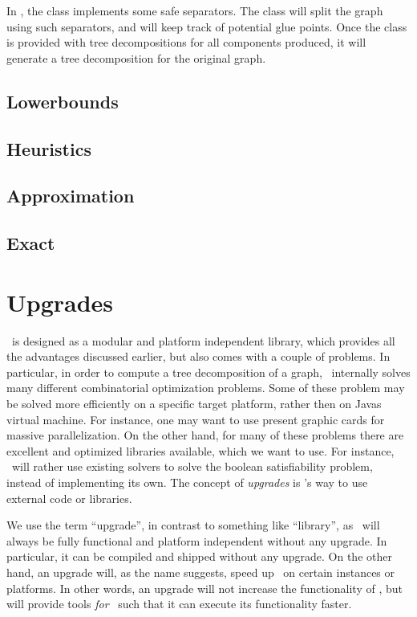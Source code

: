 \documentclass[a4paper, ukenglish, twoside, openright]{jdrasilmanual}
\begin{document}
In \Jdrasil, the class  implements some safe
separators. The class will split the graph using such separators, and
will keep track of potential glue points. Once the class is provided
with tree decompositions for all components produced, it will generate
a tree decomposition for the original graph.

\chapter{Lowerbounds}

\chapter{Heuristics}

\chapter{Approximation}

\chapter{Exact}

\part{Upgrades}

\Jdrasil\ is designed as a modular and platform independent library,
which provides all the advantages discussed earlier, but also comes
with a couple of problems. In particular, in order to compute a tree
decomposition of a graph, \Jdrasil\ internally solves many different
combinatorial optimization problems. Some of these problem may be
solved more efficiently on a specific target platform, rather then on
Javas virtual machine. For instance, one may want to use present
graphic cards for massive parallelization. On the other hand, for many
of these problems there are excellent and optimized libraries
available, which we want to use. For instance, \Jdrasil\ will rather
use existing  solvers to solve the boolean satisfiability
problem, instead of implementing its own. The concept of
\emph{upgrades} is \Jdrasil's way to use external code or
libraries. 

We use the term ``upgrade'', in contrast to something like
``library'', as \Jdrasil\ will always be fully functional and platform
independent without any upgrade. In particular, it can be compiled and
shipped without any upgrade. On the other hand, an upgrade will, as
the name suggests, speed up \Jdrasil\ on certain instances or
platforms. In other words, an upgrade will not increase the
functionality of \Jdrasil, but will provide tools \emph{for} \Jdrasil\
such that it can execute its functionality faster.
\end{document}
